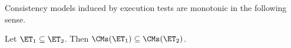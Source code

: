 Consistency models induced by execution tests are monotonic in the following sense.
\begin{proposition}
\label{prop:mono-et}
Let $\ET_1 \subseteq \ET_2$. Then $\CMs(\ET_1) \subseteq \CMs(\ET_2)$.
\end{proposition}
%
%

